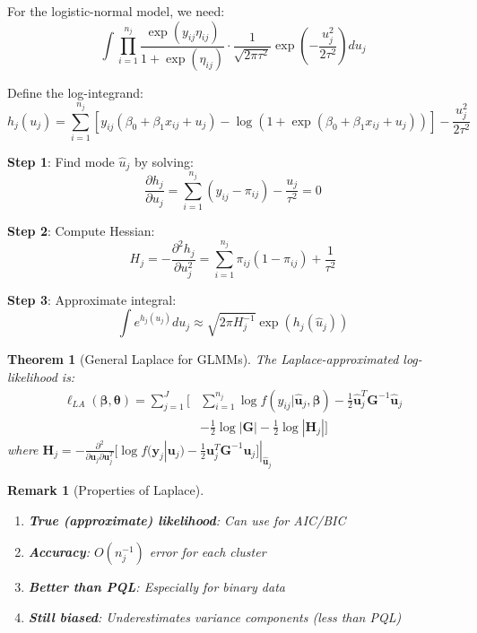 \documentclass{article}
\newtheorem{theorem}{Theorem}
\newtheorem{remark}{Remark}
\begin{document}
\begin{example}
For the logistic-normal model, we need:
\begin{equation}
\int \prod_{i=1}^{n_j} \frac{\exp(y_{ij}\eta_{ij})}{1 + \exp(\eta_{ij})} \cdot \frac{1}{\sqrt{2\pi\tau^2}}\exp\left(-\frac{u_j^2}{2\tau^2}\right) du_j
\end{equation}

Define the log-integrand:
\begin{equation}
h_j(u_j) = \sum_{i=1}^{n_j} [y_{ij}(\beta_0 + \beta_1 x_{ij} + u_j) - \log(1 + \exp(\beta_0 + \beta_1 x_{ij} + u_j))] - \frac{u_j^2}{2\tau^2}
\end{equation}

\textbf{Step 1}: Find mode $\hat{u}_j$ by solving:
\begin{equation}
\frac{\partial h_j}{\partial u_j} = \sum_{i=1}^{n_j} (y_{ij} - \pi_{ij}) - \frac{u_j}{\tau^2} = 0
\end{equation}

\textbf{Step 2}: Compute Hessian:
\begin{equation}
H_j = -\frac{\partial^2 h_j}{\partial u_j^2} = \sum_{i=1}^{n_j} \pi_{ij}(1-\pi_{ij}) + \frac{1}{\tau^2}
\end{equation}

\textbf{Step 3}: Approximate integral:
\begin{equation}
\int e^{h_j(u_j)} du_j \approx \sqrt{2\pi H_j^{-1}} \exp(h_j(\hat{u}_j))
\end{equation}
\end{example}

\begin{theorem}[General Laplace for GLMMs]
The Laplace-approximated log-likelihood is:
\begin{align}
\ell_{LA}(\boldsymbol{\beta}, \boldsymbol{\theta}) = \sum_{j=1}^J \Bigg[&\sum_{i=1}^{n_j} \log f(y_{ij}|\hat{\mathbf{u}}_j, \boldsymbol{\beta}) - \frac{1}{2}\hat{\mathbf{u}}_j^T\mathbf{G}^{-1}\hat{\mathbf{u}}_j \\
&- \frac{1}{2}\log|\mathbf{G}| - \frac{1}{2}\log|\mathbf{H}_j| \Bigg]
\end{align}
where $\mathbf{H}_j = -\frac{\partial^2}{\partial \mathbf{u}_j \partial \mathbf{u}_j^T}[\log f(\mathbf{y}_j|\mathbf{u}_j) - \frac{1}{2}\mathbf{u}_j^T\mathbf{G}^{-1}\mathbf{u}_j]|_{\hat{\mathbf{u}}_j}$
\end{theorem}

\begin{remark}[Properties of Laplace]
\begin{enumerate}
    \item \textbf{True (approximate) likelihood}: Can use for AIC/BIC
    \item \textbf{Accuracy}: $O(n_j^{-1})$ error for each cluster
    \item \textbf{Better than PQL}: Especially for binary data
    \item \textbf{Still biased}: Underestimates variance components (less than PQL)
\end{enumerate}
\end{remark}
\end{document}
